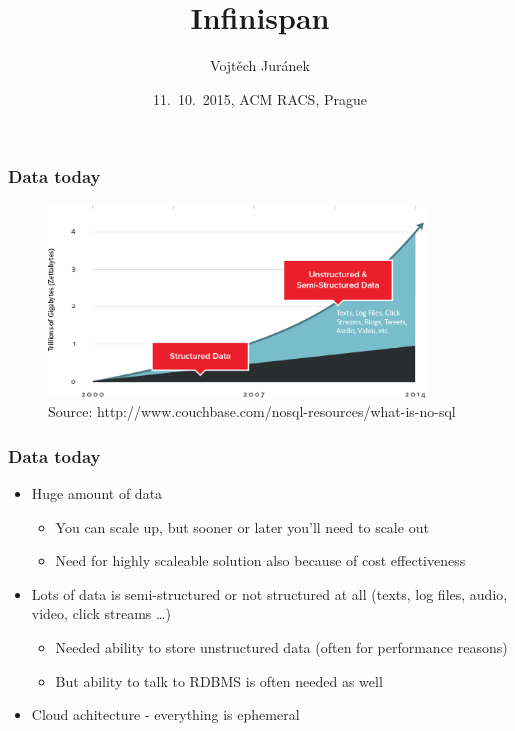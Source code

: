 \documentclass[10pt,utf8]{beamer}
\title{Infinispan}
\author{Vojtěch Juránek}
\institute[Red Hat]{JBoss - a division by Red Hat}
\date{11.~10.~2015, ACM RACS, Prague}
\begin{document}


\begin{frame}
 \titlepage
\end{frame}

\begin{frame}
	\frametitle{Data today}
	\begin{figure}
		\centering
		\includegraphics[width=10cm]{./img/why-nosql-2.eps}
		\caption{\tiny{Source: http://www.couchbase.com/nosql-resources/what-is-no-sql}}
	\end{figure}
\end{frame}

\begin{frame}
	\frametitle{Data today}
	\begin{itemize}
		\item Huge amount of data
		\begin{itemize}
			\item You can scale up, but sooner or later you'll need to scale out
			\item Need for highly scaleable solution also because of cost effectiveness
		\end{itemize}
		\item Lots of data is semi-structured or not structured at all (texts, log files, audio, video, click streams \dots)
		\begin{itemize}
			\item Needed ability to store unstructured data (often for performance reasons)
			\item But ability  to talk to RDBMS is often needed as well
		\end{itemize}
		\item Cloud achitecture - everything is ephemeral
	\end{itemize}
\end{frame}
\end{document}
